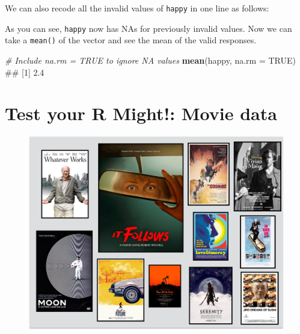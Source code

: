 \documentclass[]{book}
\newenvironment{Shaded}{\begin{snugshade}}{\end{snugshade}}
\newcommand{\KeywordTok}[1]{\textcolor[rgb]{0.13,0.29,0.53}{\textbf{{#1}}}}
\newcommand{\DataTypeTok}[1]{\textcolor[rgb]{0.13,0.29,0.53}{{#1}}}
\newcommand{\DecValTok}[1]{\textcolor[rgb]{0.00,0.00,0.81}{{#1}}}
\newcommand{\StringTok}[1]{\textcolor[rgb]{0.31,0.60,0.02}{{#1}}}
\newcommand{\CommentTok}[1]{\textcolor[rgb]{0.56,0.35,0.01}{\textit{{#1}}}}
\newcommand{\OtherTok}[1]{\textcolor[rgb]{0.56,0.35,0.01}{{#1}}}
\newcommand{\NormalTok}[1]{{#1}}
\theoremstyle{definition}
\theoremstyle{definition}
\theoremstyle{remark}
\begin{document}
We can also recode all the invalid values of \texttt{happy} in one line
as follows:

\begin{Shaded}
\end{Shaded}

As you can see, \texttt{happy} now has NAs for previously invalid
values. Now we can take a \texttt{mean()} of the vector and see the mean
of the valid responses.

\begin{Shaded}
\begin{Highlighting}[]
\CommentTok{# Include na.rm = TRUE to ignore NA values}
\KeywordTok{mean}\NormalTok{(happy, }\DataTypeTok{na.rm =} \OtherTok{TRUE}\NormalTok{)}
\NormalTok{## [1] 2.4}
\end{Highlighting}
\end{Shaded}

\section{Test your R Might!: Movie
data}\label{test-your-r-might-movie-data}

\begin{figure}

{\centering \includegraphics[width=1\linewidth]{images/moviecollage} 

}

\end{figure}
\end{document}

